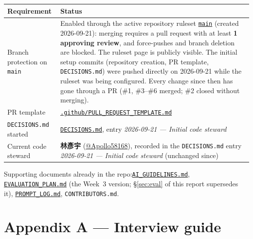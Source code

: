 \documentclass[11pt,a4paper]{article}
\newcommand{\code}[1]{\texttt{#1}}
\begin{document}
{\small
\begin{tabularx}{\linewidth}{@{}>{\raggedright\arraybackslash}p{4.2cm}L@{}}
\toprule
\textbf{Requirement} & \textbf{Status}\\
\midrule
Branch protection on \code{main} & Enabled through the active repository ruleset \href{https://github.com/Apollo58168/NYCU_AI-in-the-Loop-in-Software-Project-Cycle/rules/23748401}{\code{main}} (created 2026-09-21): merging requires a pull request with at least \textbf{1 approving review}, and force-pushes and branch deletion are blocked. The ruleset page is publicly visible. The initial setup commits (repository creation, PR template, \code{DECISIONS.md}) were pushed directly on 2026-09-21 while the ruleset was being configured. Every change since then has gone through a PR (\#1, \#3--\#6 merged; \#2 closed without merging).\\
PR template & \href{https://github.com/Apollo58168/NYCU_AI-in-the-Loop-in-Software-Project-Cycle/blob/main/.github/PULL_REQUEST_TEMPLATE.md}{\code{.github/PULL\_REQUEST\_TEMPLATE.md}}\\
\code{DECISIONS.md} started & \href{https://github.com/Apollo58168/NYCU_AI-in-the-Loop-in-Software-Project-Cycle/blob/main/DECISIONS.md}{\code{DECISIONS.md}}, entry \emph{2026-09-21 --- Initial code steward}\\
Current code steward & \textbf{林彥宇} (\href{https://github.com/Apollo58168}{@Apollo58168}), recorded in the \code{DECISIONS.md} entry \emph{2026-09-21 --- Initial code steward} (unchanged since)\\
\bottomrule
\end{tabularx}
}

Supporting documents already in the repo:\newline \href{https://github.com/Apollo58168/NYCU_AI-in-the-Loop-in-Software-Project-Cycle/blob/main/AI_GUIDELINES.md}{\code{AI\_GUIDELINES.md}}, \href{https://github.com/Apollo58168/NYCU_AI-in-the-Loop-in-Software-Project-Cycle/blob/main/EVALUATION_PLAN.md}{\code{EVALUATION\_PLAN.md}} (the Week~3 version; \S\ref{sec:eval} of this report supersedes it), \href{https://github.com/Apollo58168/NYCU_AI-in-the-Loop-in-Software-Project-Cycle/blob/main/PROMPT_LOG.md}{\code{PROMPT\_LOG.md}}, \code{CONTRIBUTORS.md}.


\appendix
\section*{Appendix A --- Interview guide}
\end{document}
